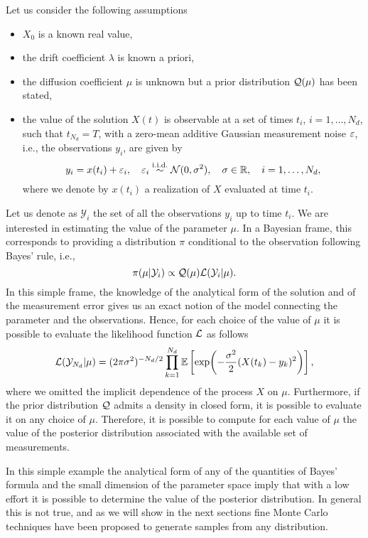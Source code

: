 Let us consider the following assumptions
\begin{itemize}
	\item $X_0$ is a known real value, 
	\item the drift coefficient $\lambda$ is known a priori,
	\item the diffusion coefficient $\mu$ is unknown but a prior distribution $\mathcal{Q}(\mu)$ has been stated,
	\item the value of the solution $X(t)$ is observable at a set of times $t_i$, $i = 1, \ldots, N_d$, such that $t_{N_d} = T$, with a zero-mean additive Gaussian measurement noise $\varepsilon$, i.e., the observations $y_i$, are given by
	\begin{equation}
		y_i = x(t_i) + \varepsilon_i, \quad \varepsilon_i \stackrel{\text{i.i.d.}}{\sim} \mathcal{N}(0, \sigma^2), \quad  \sigma \in \mathbb{R}, \quad i = 1, \ldots, N_d,
	\end{equation}  
	where we denote by $x(t_i)$ a realization of $X$ evaluated at time $t_i$.
\end{itemize}
Let us denote as $\mathcal{Y}_i$ the set of all the observations $y_i$ up to time $t_i$. We are interested in estimating the value of the parameter $\mu$. In a Bayesian frame, this corresponds to providing a distribution $\pi$ conditional to the observation following Bayes' rule, i.e.,
\begin{equation}
	\pi(\mu|\mathcal{Y}_i) \propto \mathcal{Q}(\mu) \mathcal{L}(\mathcal{Y}_i|\mu).
\end{equation}
In this simple frame, the knowledge of the analytical form of the solution and of the measurement error gives us an exact notion of the model connecting the parameter and the observations. Hence, for each choice of the value of $\mu$ it is possible to evaluate the likelihood function $\mathcal{L}$ as follows
\begin{equation}
	\mathcal{L}(\mathcal{Y}_{N_d}|\mu) = (2\pi\sigma^2)^{-N_d/2}\prod_{k = 1}^{N_d}\mathbb{E}\left[\exp(-\frac{\sigma^2}{2}(X(t_k) - y_k)^2)\right],
\end{equation}
where we omitted the implicit dependence of the process $X$ on $\mu$. Furthermore, if the prior distribution $\mathcal{Q}$ admits a density in closed form, it is possible to evaluate it on any choice of $\mu$. Therefore, it is possible to compute for each value of $\mu$ the value of the posterior distribution associated with the available set of measurements. 

In this simple example the analytical form of any of the quantities of Bayes' formula and the small dimension of the parameter space imply that with a low effort it is possible to determine the value of the posterior distribution. In general this is not true, and as we will show in the next sections fine Monte Carlo techniques have been proposed to generate samples from any distribution. 

